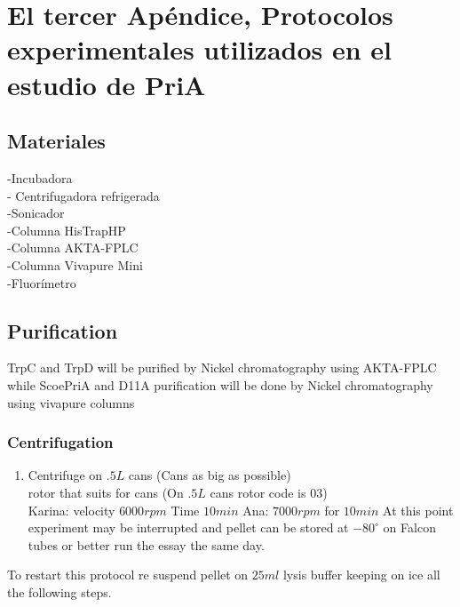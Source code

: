 \documentclass[12pt,twoside]{reedthesis}
\providecommand{\tightlist}{%
  \setlength{\itemsep}{0pt}\setlength{\parskip}{0pt}}
\begin{document}
  \chapter{El tercer Apéndice, Protocolos experimentales utilizados en el
  estudio de
  PriA}\label{el-tercer-apendice-protocolos-experimentales-utilizados-en-el-estudio-de-pria}
  
  \section{Materiales}\label{materiales}
  
  -Incubadora\\
  - Centrifugadora refrigerada\\
  -Sonicador\\
  -Columna HisTrapHP\\
  -Columna AKTA-FPLC\\
  -Columna Vivapure Mini\\
  -Fluorímetro
  
  \section{Purification}\label{purification}
  
  TrpC and TrpD will be purified by Nickel chromatography using AKTA-FPLC
  while ScoePriA and D11A purification will be done by Nickel
  chromatography using vivapure columns
  
  \subsection{Centrifugation}\label{centrifugation}
  
  \begin{enumerate}
  \def\labelenumi{\arabic{enumi}.}
  \tightlist
  \item
    Centrifuge on \(.5L\) cans (Cans as big as possible)\\
    rotor that suits for cans (On \(.5L\) cans rotor code is 03)\\
    Karina: velocity \(6000 rpm\) Time \(10 min\) Ana: \(7000rpm\) for
    \(10 min\) At this point experiment may be interrupted and pellet can
    be stored at \(-80^{\circ}\) on Falcon tubes or better run the essay
    the same day.
  \end{enumerate}
  
  To restart this protocol re suspend pellet on \(25 ml\) lysis buffer
  keeping on ice all the following steps.
  
\end{document}
